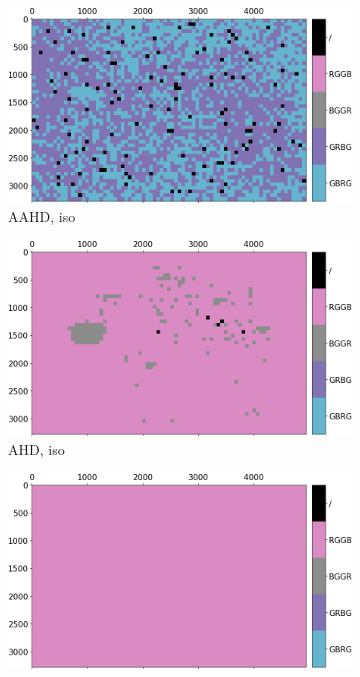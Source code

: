\documentclass{ipol}
\begin{document}
\begin{figure}[ht]
\begin{subfigure}[c]{.14\linewidth}
\includegraphics[width=\linewidth]{images/bike/AAHD/iso_64_grids.png}
\caption{AAHD, iso}
\end{subfigure}%
\begin{subfigure}[c]{.14\linewidth}
\includegraphics[width=\linewidth]{images/bike/AHD/iso_64_grids.png}
\caption{AHD, iso}
\end{subfigure}%
\begin{subfigure}[c]{.14\linewidth}
\includegraphics[width=\linewidth]{images/bike/DCB/iso_64_grids.png}

\end{subfigure}
\end{figure}
\end{document}
